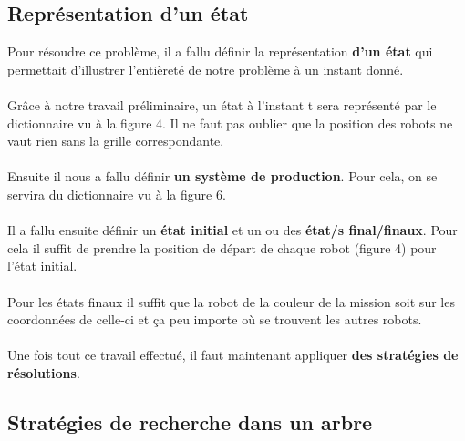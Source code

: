 \documentclass{article}
\begin{document}
\subsection{Représentation d'un état}
Pour résoudre ce problème, il a fallu définir la représentation \textbf{d'un état} qui permettait d'illustrer l'entièreté de notre problème à un instant donné.\\\\ 
Grâce à notre travail préliminaire, un état à l'instant t sera représenté par le dictionnaire vu à la figure 4. Il ne faut pas oublier que la position des robots ne vaut rien sans la grille correspondante. \\\\
Ensuite il nous a fallu définir \textbf{un système de production}. Pour cela, on se servira du dictionnaire vu à la figure 6.\\\\
Il a fallu ensuite définir un \textbf{état initial} et un ou des \textbf{état/s final/finaux}. Pour cela il suffit de prendre la position de départ de chaque robot (figure 4) pour l'état initial.\\\\
Pour les états finaux il suffit que la robot de la couleur de la mission soit sur les coordonnées de celle-ci et ça peu importe où se trouvent les autres robots.\\\\
Une fois tout ce travail effectué, il faut maintenant appliquer \textbf{des stratégies de résolutions}.
\subsection{Stratégies de recherche dans un arbre}
\end{document}
